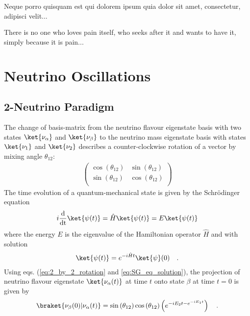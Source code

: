 \begin{savequote}[8cm]
\textlatin{Neque porro quisquam est qui dolorem ipsum quia dolor sit amet, consectetur, adipisci velit...}

There is no one who loves pain itself, who seeks after it and wants to have it, simply because it is pain...
\end{savequote}

\chapter{\label{ch:neutrino_oscillations}Neutrino Oscillations} 

\minitoc

\section{2-Neutrino Paradigm}
\label{sec:2-nu-paradigm}
The change of basis-matrix from the neutrino flavour eigenstate basis with two states $\ket{\nu_\alpha}$ and $\ket{\nu_\beta}$ to the neutrino mass eigenstate basis with states $\ket{\nu_1}$ and $\ket{\nu_2}$ describes a counter-clockwise rotation of a vector by mixing angle $\theta_{12}$:
%
\begin{align} \label{eq:2_by_2_rotation}
\begin{pmatrix}
    \cos(\theta_{12}) & \sin(\theta_{12}) \\
    \sin(\theta_{12}) & \cos(\theta_{12}) \\
\end{pmatrix}
\end{align}
%
The time evolution of a quantum-mechanical state is given by the Schr\"odinger equation
%
\begin{align} \label{eq:SG_eq}
    i \frac{\text{d}}{\text{dt}} \ket{\psi(t)} = \hat{H} \ket{\psi(t)} = E \ket{\psi(t)}
\end{align}
%
where the energy $E$ is the eigenvalue of the Hamiltonian operator $\hat{H}$ and with solution
%
\begin{align} \label{eq:SG_eq_solution}
    \ket{\psi(t)} = e^{-i \hat{H} t} \ket{\psi}(0) \quad \text{.}
\end{align}
%
Using eqs. (\ref{eq:2_by_2_rotation} and \ref{eq:SG_eq_solution}), the projection of neutrino flavour eigenstate $\ket{\nu_\alpha(t)}$ at time $t$ onto state $\beta$ at time $t=0$ is given by
%
\begin{align} \label{eq:nu_alpha_beta_projection}
    \braket{\nu_\beta(0)|\nu_\alpha(t)} = \sin{(\theta_{12})}\cos{(\theta_{12})} \left( e^{-iE_2t - e^{-i E_1t}} \right) \quad \text{.}
\end{align}
